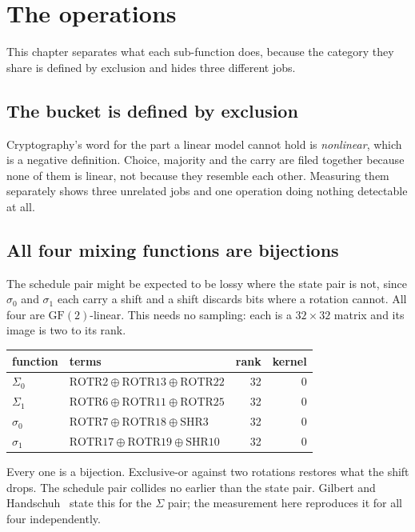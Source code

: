 \chapter{The operations}

This chapter separates what each sub-function does, because the category they share is defined by exclusion and hides three different jobs.

\section{The bucket is defined by exclusion}

Cryptography's word for the part a linear model cannot hold is \emph{nonlinear}, which is a negative definition. Choice, majority and the carry are filed together because none of them is linear, not because they resemble each other. Measuring them separately shows three unrelated jobs and one operation doing nothing detectable at all.

\section{All four mixing functions are bijections}

The schedule pair might be expected to be lossy where the state pair is not, since \(\sigma_0\) and \(\sigma_1\) each carry a shift and a shift discards bits where a rotation cannot. All four are \(\mathrm{GF}(2)\)-linear. This needs no sampling: each is a \(32 \times 32\) matrix and its image is two to its rank.

\begin{center}
\begin{tabular}{llrr}
\toprule
function & terms & rank & kernel \\
\midrule
\(\Sigma_0\) & \(\mathrm{ROTR}2 \oplus \mathrm{ROTR}13 \oplus \mathrm{ROTR}22\) & 32 & 0 \\
\(\Sigma_1\) & \(\mathrm{ROTR}6 \oplus \mathrm{ROTR}11 \oplus \mathrm{ROTR}25\) & 32 & 0 \\
\(\sigma_0\) & \(\mathrm{ROTR}7 \oplus \mathrm{ROTR}18 \oplus \mathrm{SHR}3\) & 32 & 0 \\
\(\sigma_1\) & \(\mathrm{ROTR}17 \oplus \mathrm{ROTR}19 \oplus \mathrm{SHR}10\) & 32 & 0 \\
\bottomrule
\end{tabular}
\end{center}

Every one is a bijection. Exclusive-or against two rotations restores what the shift drops. The schedule pair collides no earlier than the state pair. Gilbert and Handschuh~\cite{src:Handschuh} state this for the \(\Sigma\) pair; the measurement here reproduces it for all four independently.


